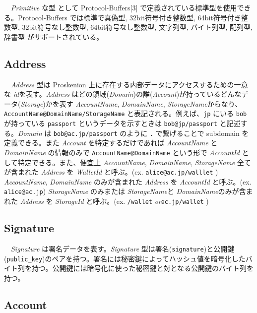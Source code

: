 　\emph{Primitive} な型 として Protocol-Buffers{[}3{]}
で定義されている標準型を使用できる。Protocol-Buffers では標準で真偽型,
32bit符号付き整数型, 64bit符号付き整数型, 32bit符号なし整数型,
64bit符号なし整数型, 文字列型, バイト列型, 配列型, 辞書型
がサポートされている。

\hypertarget{address}{%
\subsection{Address}\label{address}}

　\emph{Address} 型は Proskenion
上に存在する内部データにアクセスするための一意な
\emph{id}を表す。\emph{Address}
はどの領域(\emph{Domain})の誰(\emph{Account})が持っているどんなデータ(\emph{Storage})かを表す
\emph{AccountName}, \emph{DomainName}, \emph{StorageName}からなり、
\texttt{AccountName@DomainName/StorageName}
と表記される。例えば、\texttt{jp} にいる \texttt{bob} が持っている
\texttt{passport} というデータを示すときは \texttt{bob@jp/passport}
と記述する。\emph{Domain} は \texttt{bob@ac.jp/passport} のように
\texttt{.} で繋げることで subdomain を定義できる。また \emph{Account}
を特定するだけであれば \emph{AccountName} と \emph{DomainName}
の情報のみで \texttt{AccountName@DomainName} という形で \emph{AccountId}
として特定できる。また、便宜上 \emph{AccountName}, \emph{DomainName},
\emph{StorageName} 全てが含まれた \emph{Address} を \emph{WalletId}
と呼ぶ。(ex. \texttt{alice@ac.jp/walllet} ) \emph{AccountName},
\emph{DomainName} のみが含まれた \emph{Address} を \emph{AccountId}
と呼ぶ。(ex. \texttt{alice@ac.jp}) \emph{StorageName} のみまたは
\emph{StorageName}と \emph{DomainName}のみが含まれた \emph{Address} を
\emph{StorageId} と呼ぶ。(ex. \texttt{/wallet}
\emph{or}\texttt{ac.jp/wallet} )

\hypertarget{signature}{%
\subsection{Signature}\label{signature}}

　\emph{Signature} は署名データを表す。\emph{Signature}
型は署名(\texttt{signature})と公開鍵(\texttt{public\_key})のペアを持つ。署名には秘密鍵によってハッシュ値を暗号化したバイト列を持つ。公開鍵には暗号化に使った秘密鍵と対となる公開鍵のバイト列を持つ。

\hypertarget{account}{%
\subsection{Account}\label{account}}

